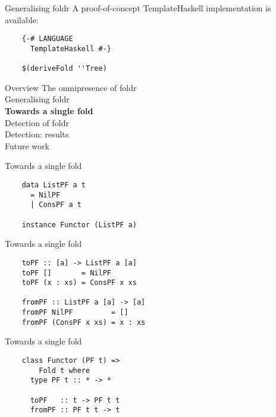 \documentclass[20pt]{beamer}
\newcommand{\vspaced}{
    \vspace{5mm}
}
\begin{document}
\begin{frame}[fragile]{Generalising foldr}
    A proof-of-concept TemplateHaskell implementation is available: \\
    \vspaced
    \begin{lstlisting}
    {-# LANGUAGE
      TemplateHaskell #-}

    $(deriveFold ''Tree)
    \end{lstlisting}
\end{frame}


\begin{frame}{Overview}
    The omnipresence of foldr \\
    Generalising foldr \\
    \textbf{Towards a single fold} \\
    Detection of foldr \\
    Detection: results \\
    Future work \\
\end{frame}

\begin{frame}[fragile]{Towards a single fold}
    \begin{lstlisting}
    data ListPF a t
      = NilPF
      | ConsPF a t

    instance Functor (ListPF a)
    \end{lstlisting}
\end{frame}

\begin{frame}[fragile]{Towards a single fold}
    \begin{lstlisting}
    toPF :: [a] -> ListPF a [a]
    toPF []       = NilPF
    toPF (x : xs) = ConsPF x xs

    fromPF :: ListPF a [a] -> [a]
    fromPF NilPF         = []
    fromPF (ConsPF x xs) = x : xs
    \end{lstlisting}
\end{frame}

\begin{frame}[fragile]{Towards a single fold}
    \begin{lstlisting}
    class Functor (PF t) =>
        Fold t where
      type PF t :: * -> *

      toPF   :: t -> PF t t
      fromPF :: PF t t -> t
    \end{lstlisting}
\end{frame}
\end{document}
